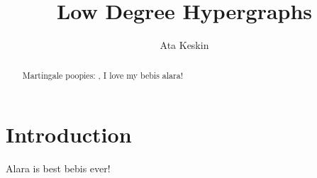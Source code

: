 \documentclass[11pt,a4paper]{article}
\begin{document}
\title{Low Degree Hypergraphs}
\author{Ata Keskin}
\maketitle

\begin{abstract}
Martingale poopies: \cite{micciancio_complexity_2002}, I love my bebis alara!
\end{abstract}

\tableofcontents

\section{Introduction}

Alara is best bebis ever!





\end{document}
